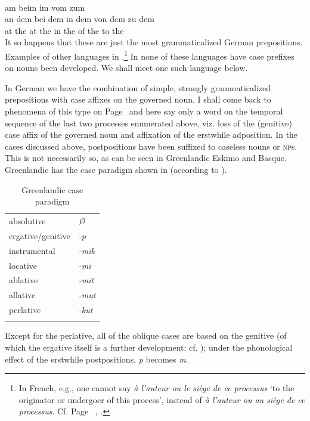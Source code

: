 \ea\label{ex:E57}
\langinfo{\LangGerm}{}{}\\
 \ea am  beim  im  vom  zum\\
\ex 
\gll an dem  bei dem  in dem  von dem  zu dem\\
  at the  at the   in the   of the  to the\\
\z
\z
\noindent It so happens that these are just the most grammaticalized German prepositions. Examples of other languages in \citealt[135--140]{Kahr1976}.\footnote{In French, e.g., one cannot say \textit{à l'auteur ou le siège de ce processus} ‘to the originator or undergoer of this process’, instead of \textit{à l'auteur ou au siège de ce processus}. Cf. Page~\pageref{ex:E106}\chkfn%
, .} In none of these languages have case prefixes on nouns been developed. We shall meet one such language below.

In German we have the combination of simple, strongly grammaticalized prepositions with case affixes on the governed noun. I shall come back to phenomena of this type on Page~\pageref{page99}\chk%
 and here say only a word on the temporal sequence of the last two processes enumerated above, viz. loss of the (genitive) case affix of the governed noun and affixation of the erstwhile adposition. In the cases discussed above, postpositions have been suffixed to caseless nouns or \textsc{np}s. This is not necessarily so, as can be seen in Greenlandic Eskimo and Basque. Greenlandic has the case paradigm shown in  (according to \citealt[310]{Woodbury1977}).

\begin{table}
\begin{tabular}{ll}
\lsptoprule

absolutive & \itshape Ø\\
ergative/genitive & \itshape {}-p\\
instrumental & \itshape {}-mik\\
locative & \itshape {}-mi\\
ablative & \itshape {}-mit\\
allative & \itshape {}-mut\\
perlative & \itshape {}-kut\\
\lspbottomrule
\end{tabular}
\caption{Greenlandic case paradigm} \label{tab:Greenlandic}
\end{table}

\noindent Except for the perlative, all of the oblique cases are based on the genitive (of which the ergative itself is a further development; cf. ); under the phonological effect of the erstwhile postpositions, \textit{p} becomes \textit{m}.

